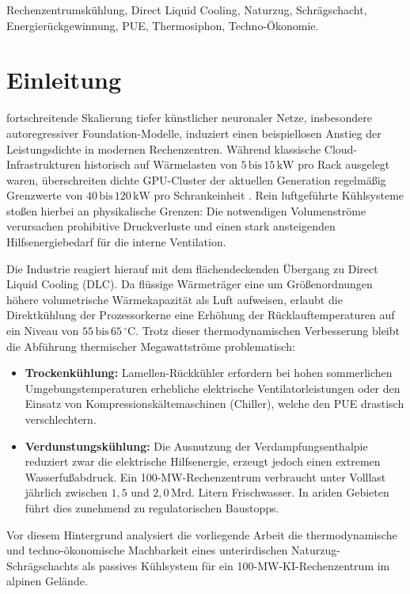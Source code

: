 \documentclass[journal]{IEEEtran}
\begin{document}
\begin{IEEEkeywords}
Rechenzentrumskühlung, Direct Liquid Cooling, Naturzug, Schrägschacht, Energierückgewinnung, PUE, Thermosiphon, Techno-Ökonomie.
\end{IEEEkeywords}

\section{Einleitung}
 fortschreitende Skalierung tiefer künstlicher neuronaler Netze, insbesondere autoregressiver Foundation-Modelle, induziert einen beispiellosen Anstieg der Leistungsdichte in modernen Rechenzentren. Während klassische Cloud-Infrastrukturen historisch auf Wärmelasten von $5\,\text{bis}\,15\,\text{kW}$ pro Rack ausgelegt waren, überschreiten dichte GPU-Cluster der aktuellen Generation regelmäßig Grenzwerte von $40\,\text{bis}\,120\,\text{kW}$ pro Schrankeinheit \cite{ashrae2023}. Rein luftgeführte Kühlsysteme stoßen hierbei an physikalische Grenzen: Die notwendigen Volumenströme verursachen prohibitive Druckverluste und einen stark ansteigenden Hilfsenergiebedarf für die interne Ventilation.

Die Industrie reagiert hierauf mit dem flächendeckenden Übergang zu Direct Liquid Cooling (DLC). Da flüssige Wärmeträger eine um Größenordnungen höhere volumetrische Wärmekapazität als Luft aufweisen, erlaubt die Direktkühlung der Prozessorkerne eine Erhöhung der Rücklauftemperaturen auf ein Niveau von $55\,\text{bis}\,65\,^\circ\text{C}$. Trotz dieser thermodynamischen Verbesserung bleibt die Abführung thermischer Megawattströme problematisch:
\begin{itemize}
    \item \textbf{Trockenkühlung:} Lamellen-Rückkühler erfordern bei hohen sommerlichen Umgebungstemperaturen erhebliche elektrische Ventilatorleistungen oder den Einsatz von Kompressionskältemaschinen (Chiller), welche den PUE drastisch verschlechtern.
    \item \textbf{Verdunstungskühlung:} Die Ausnutzung der Verdampfungsenthalpie reduziert zwar die elektrische Hilfsenergie, erzeugt jedoch einen extremen Wasserfußabdruck. Ein 100-MW-Rechenzentrum verbraucht unter Volllast jährlich zwischen $1{,}5$ und $2{,}0\,\text{Mrd. Litern}$ Frischwasser. In ariden Gebieten führt dies zunehmend zu regulatorischen Baustopps.
\end{itemize}

Vor diesem Hintergrund analysiert die vorliegende Arbeit die thermodynamische und techno-ökonomische Machbarkeit eines unterirdischen Naturzug-Schrägschachts als passives Kühlsystem für ein 100-MW-KI-Rechenzentrum im alpinen Gelände.
\end{document}
